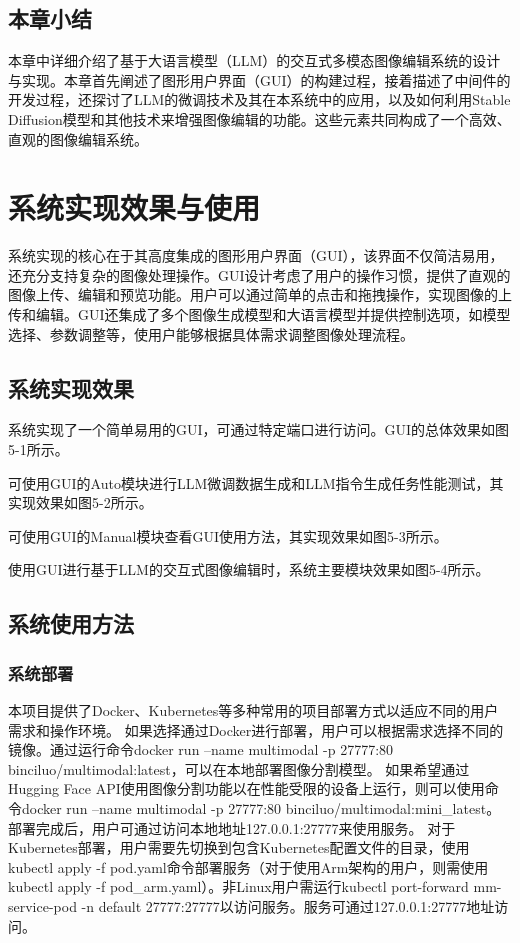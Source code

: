 \documentclass[a4paper,AutoFakeBold,oneside,12pt]{book}
\begin{document}
\section{本章小结}
本章中详细介绍了基于大语言模型（LLM）的交互式多模态图像编辑系统的设计与实现。本章首先阐述了图形用户界面（GUI）的构建过程，接着描述了中间件的开发过程，还探讨了LLM的微调技术及其在本系统中的应用，以及如何利用Stable Diffusion模型和其他技术来增强图像编辑的功能。这些元素共同构成了一个高效、直观的图像编辑系统。
\chapter{系统实现效果与使用} %
系统实现的核心在于其高度集成的图形用户界面（GUI），该界面不仅简洁易用，还充分支持复杂的图像处理操作。GUI设计考虑了用户的操作习惯，提供了直观的图像上传、编辑和预览功能。用户可以通过简单的点击和拖拽操作，实现图像的上传和编辑。GUI还集成了多个图像生成模型和大语言模型并提供控制选项，如模型选择、参数调整等，使用户能够根据具体需求调整图像处理流程。
\section{系统实现效果}
系统实现了一个简单易用的GUI，可通过特定端口进行访问。GUI的总体效果如图5-1所示。

可使用GUI的Auto模块进行LLM微调数据生成和LLM指令生成任务性能测试，其实现效果如图5-2所示。

可使用GUI的Manual模块查看GUI使用方法，其实现效果如图5-3所示。

使用GUI进行基于LLM的交互式图像编辑时，系统主要模块效果如图5-4所示。

\section{系统使用方法}
\subsection{系统部署}
本项目提供了Docker、Kubernetes等多种常用的项目部署方式以适应不同的用户需求和操作环境。
如果选择通过Docker进行部署，用户可以根据需求选择不同的镜像。通过运行命令docker run --name multimodal -p 27777:80 binciluo/multimodal:latest，可以在本地部署图像分割模型。
如果希望通过Hugging Face API使用图像分割功能以在性能受限的设备上运行，则可以使用命令docker run --name multimodal -p 27777:80 binciluo/multimodal:mini\_latest。
部署完成后，用户可通过访问本地地址127.0.0.1:27777来使用服务。
对于Kubernetes部署，用户需要先切换到包含Kubernetes配置文件的目录，使用kubectl apply -f pod.yaml命令部署服务（对于使用Arm架构的用户，则需使用kubectl apply -f pod\_arm.yaml）。非Linux用户需运行kubectl port-forward mm-service-pod -n default 27777:27777以访问服务。服务可通过127.0.0.1:27777地址访问。
\end{document}

